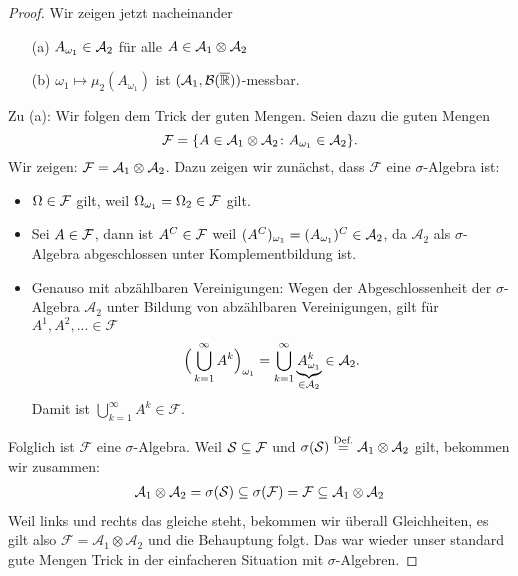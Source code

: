 \begin{proof}
Wir zeigen jetzt nacheinander
	\begin{itemize}
		\item[(a)] \label{sinnvA} $A_{\omega_1} \in \mathcal{A}_2$ f\"ur alle $A \in \mathcal{A}_1\otimes \mathcal{A}_2$
		\item[(b)] \label{sinnvB} $\omega_1 \mapsto \mu_2(A_{\omega_1})$ ist $(\mathcal A_1,\mathcal B(\overline{\mathbb{R}}))$-messbar.
	\end{itemize}
	Zu (a): Wir folgen dem Trick der guten Mengen. Seien dazu die guten Mengen $$\mathcal{F} = \{ A \in \mathcal{A}_1 \otimes \mathcal{A}_2\colon A_{\omega_1} \in \mathcal{A}_2 \}.$$ Wir zeigen: $\mathcal{F} = \mathcal{A}_1 \otimes \mathcal{A}_2$. Dazu zeigen wir zun\"achst, dass $\mathcal F$ eine $\sigma$-Algebra ist:
	\begin{itemize}
		\item $\Omega \in \mathcal{F}$ gilt, weil $\Omega_{\omega_1} = \Omega_2 \in \mathcal{F}$ gilt.
		\item Sei $A \in \mathcal{F}$, dann ist $A^C \in \mathcal{F}$ weil $(A^C)_{\omega_1} = (A_{\omega_1})^C \in \mathcal{A}_2$, da $\mathcal A_2$ als $\sigma$-Algebra abgeschlossen unter Komplementbildung ist.
		\item Genauso mit abzählbaren Vereinigungen: Wegen der Abgeschlossenheit der $\sigma$-Algebra $\mathcal A_2$ unter Bildung von abz\"ahlbaren Vereinigungen, gilt f\"ur $A^1, A^2, ... \in \mathcal F$
		\[ \Big(\bigcup_{k=1}^{\infty} A^k\Big)_{\omega_1} = \bigcup_{k=1}^{\infty} \underbrace{A_{\omega_1}^k}_{\in \mathcal{A}_2}\in \mathcal{A}_2. \]
		Damit ist $\bigcup_{k=1}^\infty A^k\in \mathcal F$.
	\end{itemize}
	Folglich ist $\mathcal F$ eine $\sigma$-Algebra. Weil $\mathcal{S} \subseteq \mathcal{F}$ und $\sigma(\mathcal{S}) \overset{\text{Def.}}{=} \mathcal{A}_1 \otimes \mathcal{A}_2$ gilt, bekommen wir zusammen:
	\begin{align*}
		\mathcal{A}_1 \otimes \mathcal{A}_2 = \sigma(\mathcal{S})  \subseteq \sigma(\mathcal{F}) = \mathcal{F} \subseteq \mathcal{A}_1 \otimes \mathcal{A}_2
	\end{align*}
	Weil links und rechts das gleiche steht, bekommen wir \"uberall Gleichheiten, es gilt also $\mathcal F=\mathcal A_1\otimes \mathcal A_2$ und die Behauptung folgt. Das war wieder unser \glqq standard\grqq{} gute Mengen Trick in der einfacheren Situation mit $\sigma$-Algebren.	\smallskip
		

\end{proof}
